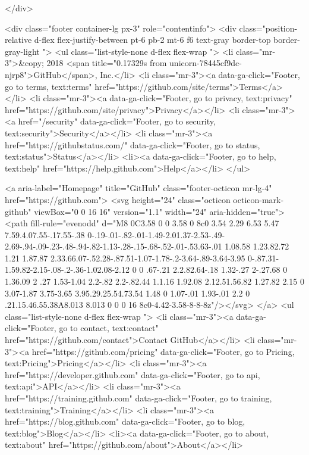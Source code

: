   </div>

        
<div class="footer container-lg px-3" role="contentinfo">
  <div class="position-relative d-flex flex-justify-between pt-6 pb-2 mt-6 f6 text-gray border-top border-gray-light ">
    <ul class="list-style-none d-flex flex-wrap ">
      <li class="mr-3">&copy; 2018 <span title="0.17329s from unicorn-78445cf9dc-njrp8">GitHub</span>, Inc.</li>
        <li class="mr-3"><a data-ga-click="Footer, go to terms, text:terms" href="https://github.com/site/terms">Terms</a></li>
        <li class="mr-3"><a data-ga-click="Footer, go to privacy, text:privacy" href="https://github.com/site/privacy">Privacy</a></li>
        <li class="mr-3"><a href="/security" data-ga-click="Footer, go to security, text:security">Security</a></li>
        <li class="mr-3"><a href="https://githubstatus.com/" data-ga-click="Footer, go to status, text:status">Status</a></li>
        <li><a data-ga-click="Footer, go to help, text:help" href="https://help.github.com">Help</a></li>
    </ul>

    <a aria-label="Homepage" title="GitHub" class="footer-octicon mr-lg-4" href="https://github.com">
      <svg height="24" class="octicon octicon-mark-github" viewBox="0 0 16 16" version="1.1" width="24" aria-hidden="true"><path fill-rule="evenodd" d="M8 0C3.58 0 0 3.58 0 8c0 3.54 2.29 6.53 5.47 7.59.4.07.55-.17.55-.38 0-.19-.01-.82-.01-1.49-2.01.37-2.53-.49-2.69-.94-.09-.23-.48-.94-.82-1.13-.28-.15-.68-.52-.01-.53.63-.01 1.08.58 1.23.82.72 1.21 1.87.87 2.33.66.07-.52.28-.87.51-1.07-1.78-.2-3.64-.89-3.64-3.95 0-.87.31-1.59.82-2.15-.08-.2-.36-1.02.08-2.12 0 0 .67-.21 2.2.82.64-.18 1.32-.27 2-.27.68 0 1.36.09 2 .27 1.53-1.04 2.2-.82 2.2-.82.44 1.1.16 1.92.08 2.12.51.56.82 1.27.82 2.15 0 3.07-1.87 3.75-3.65 3.95.29.25.54.73.54 1.48 0 1.07-.01 1.93-.01 2.2 0 .21.15.46.55.38A8.013 8.013 0 0 0 16 8c0-4.42-3.58-8-8-8z"/></svg>
</a>
   <ul class="list-style-none d-flex flex-wrap ">
        <li class="mr-3"><a data-ga-click="Footer, go to contact, text:contact" href="https://github.com/contact">Contact GitHub</a></li>
        <li class="mr-3"><a href="https://github.com/pricing" data-ga-click="Footer, go to Pricing, text:Pricing">Pricing</a></li>
      <li class="mr-3"><a href="https://developer.github.com" data-ga-click="Footer, go to api, text:api">API</a></li>
      <li class="mr-3"><a href="https://training.github.com" data-ga-click="Footer, go to training, text:training">Training</a></li>
        <li class="mr-3"><a href="https://blog.github.com" data-ga-click="Footer, go to blog, text:blog">Blog</a></li>
        <li><a data-ga-click="Footer, go to about, text:about" href="https://github.com/about">About</a></li>


